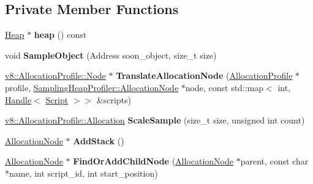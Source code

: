 \subsection*{Private Member Functions}
\begin{DoxyCompactItemize}
\item 
\hyperlink{classv8_1_1internal_1_1_heap}{Heap} $\ast$ {\bfseries heap} () const \hypertarget{classv8_1_1internal_1_1_sampling_heap_profiler_a1caa371b2bcf38e0a0c3a4a87731a2be}{}\label{classv8_1_1internal_1_1_sampling_heap_profiler_a1caa371b2bcf38e0a0c3a4a87731a2be}

\item 
void {\bfseries Sample\+Object} (Address soon\+\_\+object, size\+\_\+t size)\hypertarget{classv8_1_1internal_1_1_sampling_heap_profiler_a39de70ab03f88baaba13c99692d63733}{}\label{classv8_1_1internal_1_1_sampling_heap_profiler_a39de70ab03f88baaba13c99692d63733}

\item 
\hyperlink{structv8_1_1_allocation_profile_1_1_node}{v8\+::\+Allocation\+Profile\+::\+Node} $\ast$ {\bfseries Translate\+Allocation\+Node} (\hyperlink{classv8_1_1internal_1_1_allocation_profile}{Allocation\+Profile} $\ast$profile, \hyperlink{classv8_1_1internal_1_1_sampling_heap_profiler_1_1_allocation_node}{Sampling\+Heap\+Profiler\+::\+Allocation\+Node} $\ast$node, const std\+::map$<$ int, \hyperlink{classv8_1_1internal_1_1_handle}{Handle}$<$ \hyperlink{classv8_1_1internal_1_1_script}{Script} $>$$>$ \&scripts)\hypertarget{classv8_1_1internal_1_1_sampling_heap_profiler_af0653ecb6c91111c8d95bfc9693b5829}{}\label{classv8_1_1internal_1_1_sampling_heap_profiler_af0653ecb6c91111c8d95bfc9693b5829}

\item 
\hyperlink{structv8_1_1_allocation_profile_1_1_allocation}{v8\+::\+Allocation\+Profile\+::\+Allocation} {\bfseries Scale\+Sample} (size\+\_\+t size, unsigned int count)\hypertarget{classv8_1_1internal_1_1_sampling_heap_profiler_a3628657c4677a022d61b30828e6e560e}{}\label{classv8_1_1internal_1_1_sampling_heap_profiler_a3628657c4677a022d61b30828e6e560e}

\item 
\hyperlink{classv8_1_1internal_1_1_sampling_heap_profiler_1_1_allocation_node}{Allocation\+Node} $\ast$ {\bfseries Add\+Stack} ()\hypertarget{classv8_1_1internal_1_1_sampling_heap_profiler_a7128f29d4933b797746c4a123132895a}{}\label{classv8_1_1internal_1_1_sampling_heap_profiler_a7128f29d4933b797746c4a123132895a}

\item 
\hyperlink{classv8_1_1internal_1_1_sampling_heap_profiler_1_1_allocation_node}{Allocation\+Node} $\ast$ {\bfseries Find\+Or\+Add\+Child\+Node} (\hyperlink{classv8_1_1internal_1_1_sampling_heap_profiler_1_1_allocation_node}{Allocation\+Node} $\ast$parent, const char $\ast$name, int script\+\_\+id, int start\+\_\+position)\hypertarget{classv8_1_1internal_1_1_sampling_heap_profiler_aa5c3a298eb072cb093b72d4a5f8a6f6d}{}\label{classv8_1_1internal_1_1_sampling_heap_profiler_aa5c3a298eb072cb093b72d4a5f8a6f6d}

\end{DoxyCompactItemize}
